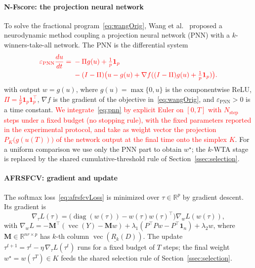 \documentclass[]{interact}
\theoremstyle{plain}
\theoremstyle{definition}
\theoremstyle{remark}
\newcommand{\R}{\mathbb{R}}
\DeclareMathOperator{\diag}{diag}
\DeclareMathOperator{\vecop}{vec}
\begin{document}
\paragraph*{N-Fscore: the projection neural network}
To solve the fractional program~\eqref{eq:wangOrig}, Wang et al.~\citep{wang2021fractional} proposed a neurodynamic method coupling a projection neural network (PNN) with a $k$-winners-take-all network. The PNN is the differential system
\begin{equation}\label{eq:pnn}\textcolor{red}{
\begin{split}\varepsilon_{\mathrm{PNN}}\frac{du}{dt}={}&-\Pi g(u)+\tfrac1p\mathbf{1}_p\\&-(I-\Pi)\bigl(u-g(u)+\nabla f((I-\Pi)g(u)+\tfrac1p\mathbf{1}_p)\bigr).\end{split}
}\end{equation}
with output $w=g(u)$, where $g(u)=\max\{0,u\}$ is the componentwise ReLU, \leavevmode\textcolor{red}{$\Pi=\tfrac1p\mathbf{1}_p\mathbf{1}_p^{\top}$}, $\nabla f$ is the gradient of the objective in~\eqref{eq:wangOrig}, and $\varepsilon_{\mathrm{PNN}}>0$ is a time constant. \leavevmode\textcolor{red}{We integrate~\eqref{eq:pnn} by explicit Euler on $[0,T]$ with $N_{\mathrm{step}}$ steps under a fixed budget (no stopping rule), with the fixed parameters reported in the experimental protocol, and take as weight vector the projection $P_K\bigl(g(u(T))\bigr)$ of the network output at the final time onto the simplex $K$}. For a uniform comparison we use only the PNN part to obtain $w^\star$; the $k$-WTA stage is replaced by the shared cumulative-threshold rule of Section~\ref{ssec:selection}.

\paragraph*{AFRSFCV: gradient and update}
The softmax loss~\eqref{eq:afrsfcvLoss} is minimized over $\tau\in\R^p$ by gradient descent. Its gradient is
\begin{equation}\label{eq:gradTau}
\nabla_\tau L(\tau)=\bigl(\diag(w(\tau))-w(\tau)w(\tau)^{\top}\bigr)\nabla_w L(w(\tau)),
\end{equation}
with $\nabla_w L=-\mathbf{M}^{\top}(\vecop(Y)-\mathbf{M}w)+\lambda_1(P^{\top}Pw-P^{\top}\mathbf{1}_n)+\lambda_2 w$, where $\mathbf{M}\in\R^{nr\times p}$ has $k$-th column $\vecop(\underline{R_k}(D))$. The update $\tau^{t+1}=\tau^t-\eta\,\nabla_\tau L(\tau^t)$ runs for a fixed budget of $T$ steps; the final weight $w^\star=w(\tau^T)\in K$ feeds the shared selection rule of Section~\ref{ssec:selection}.
\end{document}
